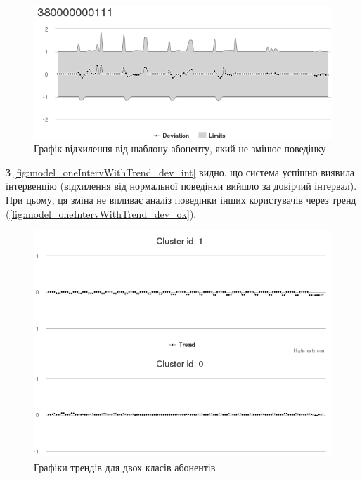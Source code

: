 \begin{figure}[h!]
        \begin{center}
            \includegraphics[scale=0.55]{resources/oneIntervWithTrend/dev-ok.png}
        \end{center}
        \caption{Графік відхилення від шаблону абоненту, який не змінює поведінку}
        \label{fig:model_oneIntervWithTrend_dev_ok}
\end{figure}

З \autoref{fig:model_oneIntervWithTrend_dev_int} видно, що система успішно виявила інтервенцію (відхилення від нормальної поведінки вийшло за довірчий інтервал). При цьому, ця зміна не впливає аналіз поведінки інших користувачів через тренд (\autoref{fig:model_oneIntervWithTrend_dev_ok}).

\begin{figure}[h!]
        \begin{center}
            \includegraphics[scale=0.55]{resources/oneIntervWithTrend/trend.png}
        \end{center}
        \caption{Графіки трендів для двох класів абонентів}
        \label{fig:model_oneIntervWithTrend_trend}
\end{figure}

